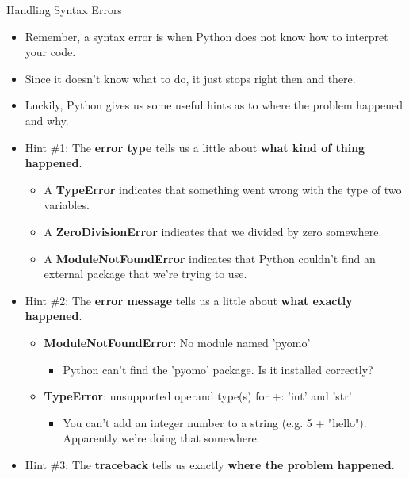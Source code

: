 \documentclass[10pt, aspectratio=169]{beamer}
\begin{document}
\begin{frame}{Handling Syntax Errors}
    \begin{itemize}
        \item Remember, a syntax error is when Python does not know how to interpret your code.
        \item Since it doesn't know what to do, it just stops right then and there.
        \item Luckily, Python gives us some useful hints as to where the problem happened and why.
        \item Hint \#1: The \textbf{error type} tells us a little about \textbf{what kind of thing happened}. 
        \begin{itemize}
            \item A \textbf{TypeError} indicates that something went wrong with the type of two variables.
            \item A \textbf{ZeroDivisionError} indicates that we divided by zero somewhere.
            \item A \textbf{ModuleNotFoundError} indicates that Python couldn't find an external package that we're trying to use.
        \end{itemize}
        \item Hint \#2: The \textbf{error message} tells us a little about \textbf{what exactly happened}. 
        \begin{itemize}
            \item \textbf{ModuleNotFoundError}: No module named 'pyomo'
            \begin{itemize}
                \item Python can't find the 'pyomo' package. Is it installed correctly?
            \end{itemize}
            \item \textbf{TypeError}: unsupported operand type(s) for +: 'int' and 'str'
            \begin{itemize}
                \item You can't add an integer number to a string (e.g. 5 + "hello"). Apparently we're doing that somewhere.
            \end{itemize}
        \end{itemize}
        \item Hint \#3: The \textbf{traceback} tells us exactly \textbf{where the problem happened}. 
    \end{itemize}
\end{frame}
\end{document}
